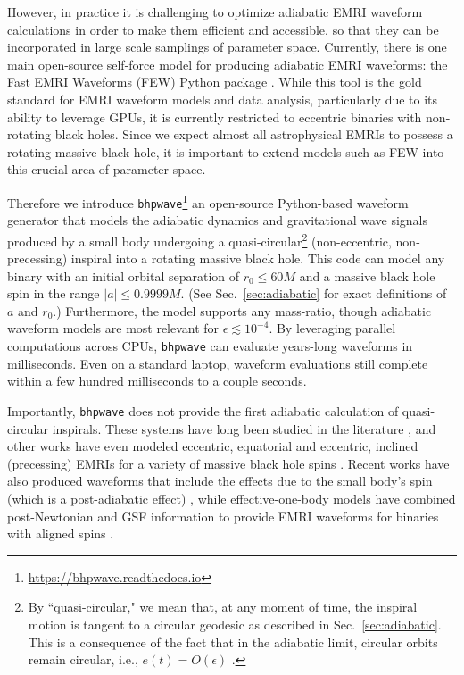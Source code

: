 \documentclass[%
 reprint,
 nofootinbib,
 amsmath,amssymb,
 aps,
 prd,
]{revtex4-2}
\begin{document}
However, in practice it is challenging to optimize adiabatic EMRI waveform calculations in order to make them efficient and accessible, so that they can be incorporated in large scale samplings of parameter space. Currently, there is one main open-source self-force model for producing adiabatic EMRI waveforms: the Fast EMRI Waveforms (FEW) Python package \cite{ChuaGallVall19, ChuaETC20, KatzETC20, KatzETC21}. While this tool is the gold standard for EMRI waveform models and data analysis, particularly due to its ability to leverage GPUs, it is currently restricted to eccentric binaries with non-rotating black holes. Since we expect almost all astrophysical EMRIs to possess a rotating massive black hole, it is important to extend models such as FEW into this crucial area of parameter space.

Therefore we introduce \texttt{bhpwave}\footnote{\href{https://bhpwave.readthedocs.io}{https://bhpwave.readthedocs.io}} an open-source Python-based waveform generator that models the adiabatic dynamics and gravitational wave signals produced by a small body undergoing a quasi-circular\footnote{By ``quasi-circular," we mean that, at any moment of time, the inspiral motion is tangent to a circular geodesic as described in Sec.~\ref{sec:adiabatic}. This is a consequence of the fact that in the adiabatic limit, circular orbits remain circular, i.e., $e(t) = O(\epsilon)$ \cite{KennOri96, Kenn98}.} (non-eccentric, non-precessing) inspiral into a {rotating} massive black hole. This code can model any binary with an initial orbital separation of $r_0 \leq 60 M$ and a massive black hole spin in the range $|a| \leq 0.9999 M$. (See Sec.~\ref{sec:adiabatic} for exact definitions of $a$ and $r_0$.) Furthermore, the model supports any mass-ratio, though adiabatic waveform models are most relevant for $\epsilon \lesssim 10^{-4}$. By leveraging parallel computations across CPUs, \texttt{bhpwave} can evaluate years-long waveforms in milliseconds. Even on a standard laptop, waveform evaluations still complete within a few hundred milliseconds to a couple seconds.

Importantly, \texttt{bhpwave} does not provide the first adiabatic calculation of quasi-circular inspirals. These systems have long been studied in the literature \cite{Detw78, KennOri96, FinnThor00, Hugh00b, GralHughWarb16}, and other works have even modeled eccentric, equatorial and eccentric, inclined (precessing) EMRIs for a variety of massive black hole spins \cite{FujiShib20, SkouLuke22, HughETC21}. Recent works have also produced waveforms that include the effects due to the small body's spin (which is a post-adiabatic effect) \cite{SkouLuke22, DrumETC23}, while effective-one-body models have combined post-Newtonian and GSF information to provide EMRI waveforms for binaries with aligned spins \cite{AlbeETC23}. 
\end{document}
